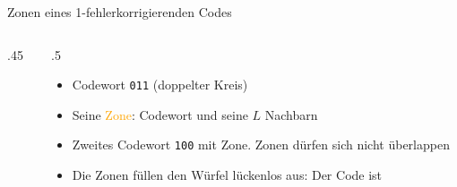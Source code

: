 \begin{frame}{Zonen eines 1-fehlerkorrigierenden Codes}
    \begin{columns}
        \begin{column}{.45\textwidth}
            \begin{center}
            \end{center}
        \end{column}
        \begin{column}{.5\textwidth}
            \begin{itemize}
                \item<2-> Codewort \texttt{011} (doppelter Kreis)
                \item<3-> Seine \textcolor{orange}{Zone}: Codewort und seine \(L\) Nachbarn
                \item<4-> Zweites Codewort \texttt{100} mit \textcolor{green!60!black}{Zone}. Zonen dürfen sich nicht überlappen
                \item<5-> Die Zonen füllen den Würfel lückenlos aus: Der Code ist 
            \end{itemize}
        \end{column}
    \end{columns}
\end{frame}

